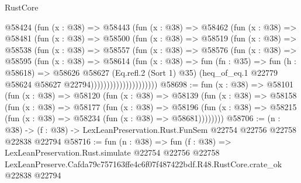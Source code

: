 \begin{lexlean}{RustCore}
\begin{coremodule}
                    @58424
                      (fun (x : @38) =>
                      @58443
                        (fun (x : @38) =>
                        @58462
                          (fun (x : @38) =>
                          @58481
                            (fun (x : @38) =>
                            @58500
                              (fun (x : @38) =>
                              @58519
                                (fun (x : @38) =>
                                @58538
                                  (fun (x : @38) =>
                                  @58557
                                    (fun (x : @38) =>
                                    @58576
                                      (fun (x : @38) =>
                                      @58595
                                        (fun (x : @38) =>
                                        @58614
                                          (fun (x : @38) =>
                                          fun (fn : @35) =>
                                          fun (h : @58618) =>
                                          @58626
                                            @58627
                                            (Eq.refl.{2} (Sort 1) @35)
                                            (heq_of_eq.{1}
                                              @22779
                                              @58624
                                              @58627
                                              @22794)))))))))))))))))))))
@58698 := fun (x : @38) =>
  @58101
    (fun (x : @38) =>
    @58120
      (fun (x : @38) =>
      @58139
        (fun (x : @38) =>
        @58158
          (fun (x : @38) =>
          @58177
            (fun (x : @38) =>
            @58196
              (fun (x : @38) => @58215 (fun (x : @38) => @58234 (fun (x : @38) => @58681))))))))
@58706 := (n : @38) ->
  (f : @38) -> LexLeanPreservation.Rust.FunSem @22754 @22756 @22758 @22838 @22794
@58716 := fun (n : @38) =>
  fun (f : @38) =>
  LexLeanPreservation.Rust.simulate
    @22754
    @22756
    @22758
    LexLeanPreserve.Cafda79c757163ffe4c6f07f487422bdf.R48.RustCore.crate_ok
    @22838
    @22794
\end{coremodule}
\end{lexlean}
